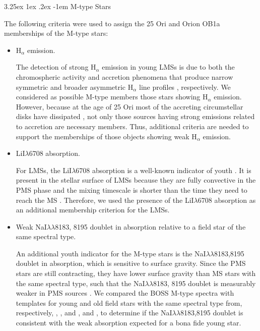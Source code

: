 \documentclass[12pt]{article}
\makeatletter
\renewcommand\paragraph{\@startsection{paragraph}{5}{\z@}%
  {3.25ex \@plus1ex \@minus.2ex}%
  {-1em}%
  {\normalfont\normalsize\bfseries}}
\makeatother
\begin{document}
\paragraph{M-type Stars\\}
\label{sec_BOSS:M_stars}

The following criteria were used to assign the 25 Ori and Orion OB1a memberships of the M-type stars:

\begin{itemize}
	\item H$_\alpha$ emission.
				
		The detection of strong H$_\alpha$ emission in young LMSs is due to both the chromospheric activity and accretion phenomena that produce narrow symmetric and broader asymmetric H$_\alpha$ line profiles \citep{Muzerolle2005}, respectively. We considered as possible M-type members those stars showing H$_\alpha$ emission. However, because at the age of 25 Ori most of the accreting circumstellar disks have dissipated \citep{Calvet2005}, not only those sources having strong emissions related to accretion are necessary members. Thus, additional criteria are needed to support the memberships of those objects showing weak H$_\alpha$ emission.

	\item LiI$\lambda$6708 absorption.

		For LMSs, the LiI$\lambda$6708 absorption is a well-known indicator of youth \citep{Strom1989, Briceno1998}. It is present in the stellar surface of LMSs because they are fully convective in the PMS phase and the mixing timescale is shorter than the time they need to reach the MS \citep{Soderblom1993}. Therefore, we used the presence of the LiI$\lambda$6708 absorption as an additional membership criterion for the LMSs.

	\item Weak NaI$\lambda\lambda$8183, 8195 doublet in absorption relative to a field star of the same spectral type.

		An additional youth indicator for the M-type stars is the NaI$\lambda\lambda$8183,8195 doublet in absorption, which is sensitive to surface gravity. Since the PMS stars are still contracting, they have lower surface gravity than MS stars with the same spectral type, such that the NaI$\lambda\lambda$8183, 8195 doublet is measurably weaker in PMS sources \citep{Luhman2003a}. We compared the BOSS M-type spectra with templates for young and old field stars with the same spectral type from, respectively, \citet{Luhman2000}, \citet{Briceno2002}, \citet{Luhman2003b} and \citet{Luhman2004}, and \citet{Kirkpatrick1999}, to determine if the NaI$\lambda\lambda$8183,8195 doublet is consistent with the weak absorption expected for a bona fide young star.

\end{itemize}
\end{document}
